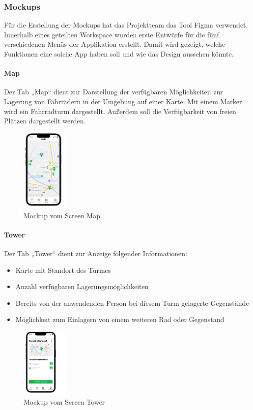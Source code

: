 \subsubsection{Mockups}
Für die Erstellung der Mockups hat das Projektteam das Tool Figma verwendet. Innerhalb eines geteilten Workspace wurden erste Entwürfe für die fünf verschiedenen Menüs der Applikation erstellt. Damit wird gezeigt, welche Funktionen eine solche App haben soll und wie das Design aussehen könnte.\\

\paragraph{Map}Der Tab „Map“ dient zur Darstellung der verfügbaren Möglichkeiten zur Lagerung von Fahrrädern in der Umgebung auf einer Karte. Mit einem Marker wird ein Fahrradturm dargestellt. Außerdem soll die Verfügbarkeit von freien Plätzen dargestellt werden.\\
\begin{figure}[H]
  \centering
  \includegraphics[width=0.2\textwidth]{images/app_mock_map}
  \caption{Mockup vom Screen Map}
  \label{fig:screenmap}
\end{figure}

\paragraph{Tower}Der Tab „Tower“ dient zur Anzeige folgender Informationen:\\
\begin{itemize}
  \item Karte mit Standort des Turmes
  \item Anzahl verfügbaren Lagerungsmöglichkeiten
  \item Bereits von der anwendenden Person bei diesem Turm gelagerte Gegenstände 
  \item Möglichkeit zum Einlagern von einem weiteren Rad oder Gegenstand
\end{itemize}
\begin{figure}[H]
  \centering
  \includegraphics[width=0.2\textwidth]{images/app_mock_tower}
  \caption{Mockup vom Screen Tower}
  \label{fig:screentower}
\end{figure}

